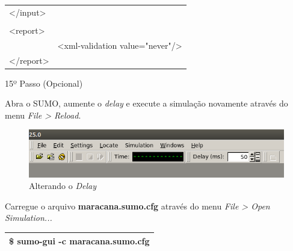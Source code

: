 \documentclass[
12pt,				%
openright,			%
oneside,			%
a4paper,			%
brazil,				%
]{abntex2}
\begin{document}
{\begin{anexosenv}
	            \begin{table}[H]
		            \renewcommand{\arraystretch}{1}
	                \begin{tabular}{|lp{13.3cm}|}
		                \hline
		                    </input>    & \\
                                        & \\
                            <report>    & \\
                                        & <xml-validation value="never"/> \\
                            </report>   & \\
		                \hline
		            \end{tabular}
	            \end{table}
        	

            	\begin{description}
                    \item[15º Passo (Opcional)]
                \end{description}
                \par Abra o SUMO, aumente o \textit{delay} e execute a simulação novamente através do menu \textit{File > Reload}.
		            
                \begin{figure} [H]
	                \centering
	                \includegraphics[scale=.7]{figuras/aneC/75Delay}
	                \caption{\label{fig_75}Alterando o \textit{Delay}}
                \end{figure}
                
                \par Carregue o arquivo \textbf{maracana.sumo.cfg} através do menu \textit{File > Open Simulation...}
		
	            \begin{table}[H]
		            \renewcommand{\arraystretch}{1.5}
	                \begin{tabular}{|p{15.5cm}|}
		                \hline
                        \$ sumo-gui -c \textbf{maracana}.sumo.cfg \\
		                \hline
		            \end{tabular}
	            \end{table}
            

\end{anexosenv}}
\end{document}
